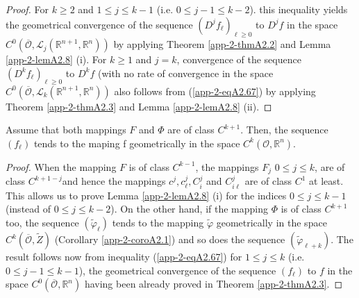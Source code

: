\begin{proof}
For $k \geq 2$ and $1 \leq j \leq k-1$ (i.e. $0 \leq j-1 \leq
k-2$). this inequality yields the geometrical convergence of the
sequence $(D^{j}f_{\ell})_{\ell \geq 0}$ to $D^{j}f$ in the space
$C^{0}(\overline{\mathscr{O}}, \mathscr{L}_{j}(\mathbb{R}^{n+1},
\mathbb{R}^{n}))$ by applying Theorem \ref{app-2-thmA2.2} and Lemma \ref{app-2-lemA2.8} (i). For $k
\geq 1$ and $j = k$, convergence of the sequence
$(D^{k}f_{\ell})_{\ell \geq 0}$ to $D^{k}f$ (with no rate of
convergence in the space $C^{0}( \overline{\mathscr{O}},
\mathscr{L}_{k}(\mathbb{R}^{n+1}, \mathbb{R}^{n}))$ also follows from
(\ref{app-2-eqA2.67}) by applying Theorem \ref{app-2-thmA2.3} and Lemma \ref{app-2-lemA2.8} (ii).
\end{proof}

\begin{alphcorollary}\label{app-2-coroA2.2}%
Assume that both mappings $F$ and $\Phi$ are of class  $C^{k+1}$. Then,
the sequence $(f_{\ell})$ tends to the maping f geometrically in the
space $C^{k}(\mathscr{O}, \mathbb{R}^{n})$.
\end{alphcorollary}

\begin{proof}
When the mapping $F$ is of class $C^{k-1}$, the mappings $F_{j}$ $0 \leq
j \leq k$, are of class $C^{k+1-j}$and hence the mappings $c^{j},
c_{\ell}^{j}, C_{i}^{j}$ and $C_{i\ell}^{j}$ are of class $C^{1}$ at
least. This allows us to prove Lemma \ref{app-2-lemA2.8} (i) for the indices $0 \leq j
\leq k-1$ (instead of $0 \leq j \leq k-2$). On the other hand, if the
mapping $\Phi$ is of class $C^{k+1}$ too, the sequence
$(\widetilde{\varphi}_{\ell})$ tends to the mapping
$\widetilde{\varphi}$ geometrically in the space
$C^{k}(\overline{\mathscr{O}}, \widetilde{Z})$ (Corollary \ref{app-2-coroA2.1}) and so
does the sequence $(\widetilde{\varphi}_{\ell + k})$. The result
follows now from inequality (\ref{app-2-eqA2.67}) for $1 \leq j \leq k$ (i.e. $0
\leq j-1 \leq k-1$), the geometrical convergence of the sequence
$(f_{\ell})$ to $f$ in the space $C^{0}(\overline{\mathscr{O}},
\mathbb{R}^{n})$ having been already proved in Theorem \ref{app-2-thmA2.3}.
\end{proof}


